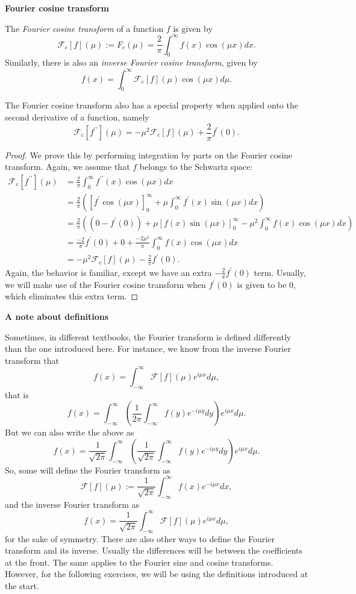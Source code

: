 \textbf{Fourier cosine transform}

The \emph{Fourier cosine transform} of a function $f$ is given by
$$ \mathcal{F}_c[f](\mu) := F_c(\mu) = \frac{2}{\pi} \int_{0}^{\infty} f(x) \cos(\mu x) dx. $$
Similarly, there is also an \emph{inverse Fourier cosine transform}, given by
$$f(x) = \int_{0}^{\infty} \mathcal{F}_c[f](\mu) \cos(\mu x) d\mu.$$

The Fourier cosine transform also has a special property when applied onto the second derivative of a function, namely
$$\mathcal{F}_c[f^{\prime\prime}](\mu) = -\mu^2\mathcal{F}_c[f](\mu) + \frac{2}{\pi}f^\prime(0).$$

\begin{proof}
	We prove this by performing integration by parts on the Fourier cosine transform. Again, we assume that $f$ belongs to the Schwartz space:
	\begin{align*}
	\mathcal{F}_c[f^{\prime\prime}](\mu) &= \frac{2}{\pi} \int_{0}^{\infty} f^{\prime\prime}(x) \cos(\mu x) dx \\
	&= \frac{2}{\pi}\left(\left[f^{\prime} \cos(\mu x) \right]_{0}^{\infty} + \mu \int_{0}^{\infty} f^{\prime}(x) \sin(\mu x) dx \right)\\
	&= \frac{2}{\pi}\left((0-f^\prime(0)) + \mu \left[f(x) \sin(\mu x) \right]_{0}^{\infty} - \mu^2
	\int_{0}^{\infty} f(x) \cos(\mu x) dx \right)\\
	&= \frac{-2}{\pi}f^\prime(0) + 0 + \frac{-2\mu^2}{\pi}
	\int_{0}^{\infty} f(x) \cos(\mu x) dx\\
	&= -\mu^2\mathcal{F}_c[f](\mu) - \frac{2}{\pi}f^\prime(0).
	\end{align*}
	Again, the behavior is familiar, except we have an extra $- \frac{2}{\pi}f^\prime(0)$ term. Usually, we will make use of the Fourier cosine transform when  $f^\prime(0)$ is given to be 0, which eliminates this extra term.
\end{proof}

\textbf{A note about definitions}

Sometimes, in different textbooks, the Fourier transform is defined differently than the one introduced here. For instance, we know from the inverse Fourier transform that
$$f(x) = \int_{-\infty}^{\infty} \mathcal{F}[f](\mu) e^{i\mu x} d\mu,$$
that is
$$f(x) = \int_{-\infty}^{\infty} \left(\frac{1}{2\pi} \int_{-\infty}^{\infty} f(y) e^{-i\mu y} dy\right) e^{i\mu x} d\mu. $$ 
But we can also write the above as
$$f(x) = \frac{1}{\sqrt{2\pi}}\int_{-\infty}^{\infty} \left(\frac{1}{\sqrt{2\pi}} \int_{-\infty}^{\infty} f(y) e^{-i\mu y} dy\right) e^{i\mu x} d\mu. $$
So, some will define the Fourier transform as
$$ \mathcal{F}[f](\mu) := \frac{1}{\sqrt{2\pi}} \int_{-\infty}^{\infty} f(x) e^{-i\mu x} dx, $$
and the inverse Fourier transform as
$$f(x) = \frac{1}{\sqrt{2\pi}}\int_{-\infty}^{\infty} \mathcal{F}[f](\mu) e^{i\mu x} d\mu,$$ for the sake of symmetry.
There are also other ways to define the Fourier transform and its inverse. Usually the differences will be between the coefficients at the front. The same applies to the Fourier sine and cosine transforms. However, for the following exercises, we will be using the definitions introduced at the start.

